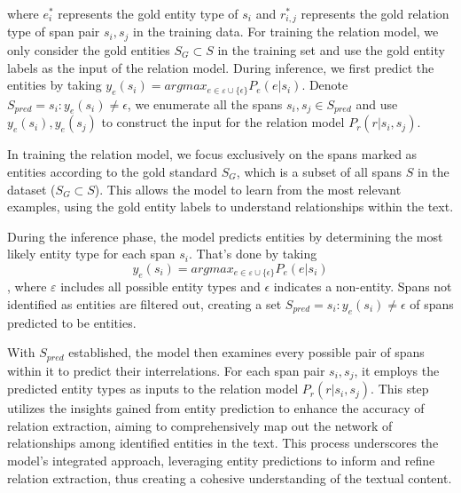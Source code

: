 where \(e_i^*\) represents the gold entity type of \(s_i\) and \(r_{i,j}^*\) represents the gold relation type of span pair \(s_i,s_j\) in the training data. For training the relation model, we only consider the gold entities \(S_G \subset S \) in the training set and use the gold entity labels as the input of the relation model. During inference, we first predict the entities by taking \(y_e(s_i) = arg max_{e \in \varepsilon \cup \{\epsilon\}} P_e(e|s_i)\). Denote 
\(S_{pred} = {s_i:y_e(s_i) \neq \epsilon}\), 
we enumerate all the spans \(s_i , s_j \in S_{pred}\) 
and use \(y_e(s_i), y_e(s_j)\) to construct the input for the relation model \(P_r(r|s_i,s_j )\).

In training the relation model, we focus exclusively on the spans marked as entities according to the gold standard \(S_G\), which is a subset of all spans \(S\) in the dataset (\(S_G \subset S\)). This allows the model to learn from the most relevant examples, using the gold entity labels to understand relationships within the text.

During the inference phase, the model predicts entities by determining the most likely entity type for each span \(s_i\). That's done by taking \[y_e(s_i) = arg max_{e \in \varepsilon \cup \{\epsilon\}} P_e(e|s_i)\], where \(\varepsilon\) includes all possible entity types and \(\epsilon\) indicates a non-entity. Spans not identified as entities are filtered out, creating a set \(S_{pred} = {s_i:y_e(s_i) \neq \epsilon}\) of spans predicted to be entities.

With \(S_{pred}\) established, the model then examines every possible pair of spans within it to predict their interrelations. For each span pair \(s_i,s_j \), it employs the predicted entity types as inputs to the relation model \(P_r(r|s_i,s_j )\). This step utilizes the insights gained from entity prediction to enhance the accuracy of relation extraction, aiming to comprehensively map out the network of relationships among identified entities in the text. This process underscores the model's integrated approach, leveraging entity predictions to inform and refine relation extraction, thus creating a cohesive understanding of the textual content.